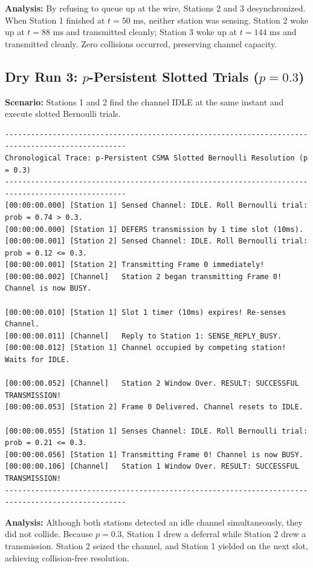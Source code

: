 \documentclass[12pt, a4paper]{article}
\begin{document}
\textbf{Analysis:} By refusing to queue up at the wire, Stations 2 and 3 desynchronized. When Station 1 finished at $t = 50\text{ ms}$, neither station was sensing. Station 2 woke up at $t = 88\text{ ms}$ and transmitted cleanly; Station 3 woke up at $t = 144\text{ ms}$ and transmitted cleanly. Zero collisions occurred, preserving channel capacity.

\subsection{Dry Run 3: $p$-Persistent Slotted Trials ($p = 0.3$)}
\textbf{Scenario:} Stations 1 and 2 find the channel IDLE at the same instant and execute slotted Bernoulli trials.

\begin{scriptsize}
\begin{verbatim}
--------------------------------------------------------------------------------------------------
Chronological Trace: p-Persistent CSMA Slotted Bernoulli Resolution (p = 0.3)
--------------------------------------------------------------------------------------------------
[00:00:00.000] [Station 1] Sensed Channel: IDLE. Roll Bernoulli trial: prob = 0.74 > 0.3.
[00:00:00.000] [Station 1] DEFERS transmission by 1 time slot (10ms).
[00:00:00.001] [Station 2] Sensed Channel: IDLE. Roll Bernoulli trial: prob = 0.12 <= 0.3.
[00:00:00.001] [Station 2] Transmitting Frame 0 immediately!
[00:00:00.002] [Channel]   Station 2 began transmitting Frame 0! Channel is now BUSY.

[00:00:00.010] [Station 1] Slot 1 timer (10ms) expires! Re-senses Channel.
[00:00:00.011] [Channel]   Reply to Station 1: SENSE_REPLY_BUSY.
[00:00:00.012] [Station 1] Channel occupied by competing station! Waits for IDLE.

[00:00:00.052] [Channel]   Station 2 Window Over. RESULT: SUCCESSFUL TRANSMISSION!
[00:00:00.053] [Station 2] Frame 0 Delivered. Channel resets to IDLE.

[00:00:00.055] [Station 1] Senses Channel: IDLE. Roll Bernoulli trial: prob = 0.21 <= 0.3.
[00:00:00.056] [Station 1] Transmitting Frame 0! Channel is now BUSY.
[00:00:00.106] [Channel]   Station 1 Window Over. RESULT: SUCCESSFUL TRANSMISSION!
--------------------------------------------------------------------------------------------------
\end{verbatim}
\end{scriptsize}

\textbf{Analysis:} Although both stations detected an idle channel simultaneously, they did not collide. Because $p = 0.3$, Station 1 drew a deferral while Station 2 drew a transmission. Station 2 seized the channel, and Station 1 yielded on the next slot, achieving collision-free resolution.
\end{document}
